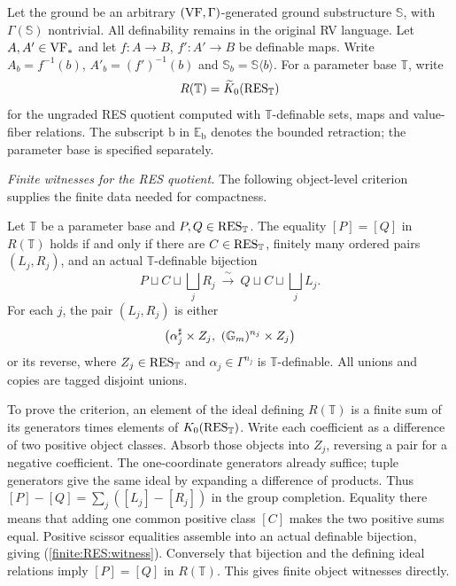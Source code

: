 Let the ground be an arbitrary
$(\mathrm{VF},\Gamma)$-generated ground substructure $\mathbb S$,
with $\Gamma(\mathbb S)$ nontrivial.
All definability remains in the original RV language.
Let $A,A'\in\mathrm{VF}_*$ and let
$f:A\to B$, $f':A'\to B$ be definable maps.
Write $A_b=f^{-1}(b)$, $A'_b=(f')^{-1}(b)$ and
$\mathbb S_b=\mathbb S\langle b\rangle$.
For a parameter base $\mathbb T$, write
\[
 R(\mathbb T)=\widetilde K_0(\mathrm{RES}_{\mathbb T})
\]
for the ungraded RES quotient computed with
$\mathbb T$-definable sets, maps and value-fiber relations.
The subscript $\mathrm b$ in $\mathbb E_{\mathrm b}$ denotes
the bounded retraction; the parameter base is specified
separately.

\medskip
\noindent\emph{Finite witnesses for the RES quotient.}
The following object-level criterion supplies the finite
data needed for compactness.

\begin{test}\label{test}
Let $\mathbb T$ be a parameter base and
$P,Q\in\mathrm{RES}_{\mathbb T}$.
The equality $[P]=[Q]$ in $R(\mathbb T)$ holds if and only if
there are $C\in\mathrm{RES}_{\mathbb T}$, finitely many ordered pairs
$(L_j,R_j)$, and an actual $\mathbb T$-definable bijection
\begin{equation}\label{finite:RES:witness}
 P\sqcup C\sqcup\bigsqcup_j R_j
       \ \xrightarrow{\ \sim\ }\
 Q\sqcup C\sqcup\bigsqcup_j L_j .
\end{equation}
For each $j$, the pair $(L_j,R_j)$ is either
\[
 \bigl(\alpha_j^\sharp\times Z_j,\
              (\mathbb G_m)^{n_j}\times Z_j\bigr)
\]
or its reverse, where
$Z_j\in\mathrm{RES}_{\mathbb T}$ and
$\alpha_j\in\Gamma^{n_j}$ is $\mathbb T$-definable.
All unions and copies are tagged disjoint unions.
\end{test}

To prove the criterion, an element of the ideal defining
$R(\mathbb T)$ is a finite sum of its generators times
elements of $K_0(\mathrm{RES}_{\mathbb T})$.
Write each coefficient as a difference of two positive
object classes. Absorb those objects into $Z_j$, reversing
a pair for a negative coefficient.
The one-coordinate generators already suffice; tuple
generators give the same ideal by expanding a difference
of products.
Thus $[P]-[Q]=\sum_j([L_j]-[R_j])$ in the group completion.
Equality there means that adding one common positive class
$[C]$ makes the two positive sums equal.
Positive scissor equalities assemble into an actual
definable bijection, giving
(\ref{finite:RES:witness}).
Conversely that bijection and the defining ideal relations
imply $[P]=[Q]$ in $R(\mathbb T)$.
This gives finite object witnesses directly.


